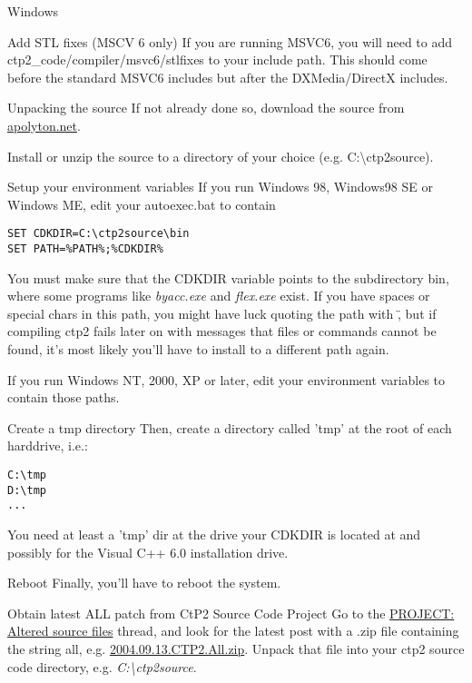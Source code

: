 \begin{section}{Windows}
\begin{subsection}{Add STL fixes (MSCV 6 only)}
If you are running MSVC6, you will need to add ctp2\_code/compiler/msvc6/stlfixes to your include path. This should come before the standard MSVC6 includes but after the DXMedia/DirectX includes.
\end{subsection}

\begin{subsection}{Unpacking the source}
If not already done so, download the source from \href{http://ctp2files.apolyton.net/source/}{apolyton.net}.

Install or unzip the source to a directory of your choice (e.g. C:\textbackslash{}ctp2source).
\end{subsection}%

\begin{subsection}{Setup your environment variables}
If you run Windows 98, Windows98 SE or Windows ME, edit your autoexec.bat to contain
\begin{verbatim}
SET CDKDIR=C:\ctp2source\bin
SET PATH=%PATH%;%CDKDIR%
\end{verbatim}
You must make sure that the CDKDIR variable points to the subdirectory bin, where some programs like \textit{byacc.exe} and \textit{flex.exe} exist. If you have spaces or special chars in this path, you might have luck quoting the path with \", but if compiling ctp2 fails later on with messages that files or commands cannot be found, it's most likely you'll have to install to a different path again.

If you run Windows NT, 2000, XP or later, edit your environment variables to contain those paths.
\end{subsection}%

\begin{subsection}{Create a tmp directory}
Then, create a directory called 'tmp' at the root of each harddrive, i.e.:
\begin{verbatim}
C:\tmp
D:\tmp
...
\end{verbatim}
You need at least a 'tmp' dir at the drive your CDKDIR is located at and possibly for the Visual C++ 6.0 installation drive.
\end{subsection}%

\begin{subsection}{Reboot}
Finally, you'll have to reboot the system.
\end{subsection}%

\begin{subsection}{Obtain latest ALL patch from CtP2 Source Code Project}
Go to the \href{http://apolyton.net/forums/showthread.php?threadid=100609&goto=lastpost}{PROJECT: Altered source files} thread, and look for the latest post with a .zip file containing the string all, e.g. \href{http://apolyton.net/csd.php?http://apolyton.net/go.php?http://page.mi.fu-berlin.de/~guehmann/CTP2/2004.09.13.CTP2.All.zip}{2004.09.13.CTP2.All.zip}. Unpack that file into your ctp2 source code directory, e.g. \textit{C:\textbackslash{}ctp2source}.
\end{subsection}%


\end{section}
